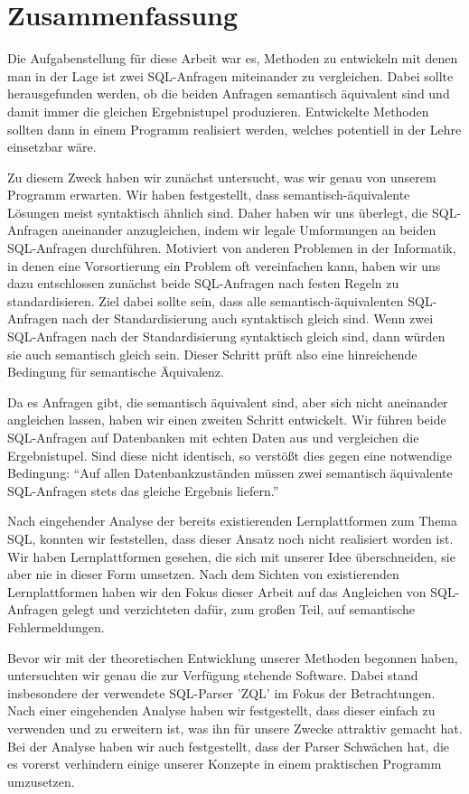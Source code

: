 
\section{Zusammenfassung}

Die Aufgabenstellung für diese Arbeit war es, Methoden zu entwickeln mit denen man in der Lage ist zwei SQL-Anfragen miteinander zu vergleichen. Dabei sollte herausgefunden werden, ob die beiden Anfragen semantisch äquivalent sind und damit immer die gleichen Ergebnistupel produzieren. Entwickelte Methoden sollten dann in einem Programm realisiert werden, welches potentiell in der Lehre einsetzbar wäre. 

Zu diesem Zweck haben wir zunächst untersucht, was wir genau von unserem Programm erwarten. Wir haben festgestellt, dass semantisch-äquivalente Lösungen meist syntaktisch ähnlich sind. Daher haben wir uns überlegt, die SQL-Anfragen aneinander anzugleichen, indem wir legale Umformungen an beiden SQL-Anfragen durchführen. Motiviert von anderen Problemen in der Informatik, in denen eine Vorsortierung ein Problem oft vereinfachen kann, haben wir uns dazu entschlossen zunächst beide SQL-Anfragen nach festen Regeln zu standardisieren. Ziel dabei sollte sein, dass alle semantisch-äquivalenten SQL-Anfragen nach der Standardisierung auch syntaktisch gleich sind. Wenn zwei SQL-Anfragen nach der Standardisierung syntaktisch gleich sind, dann würden sie auch semantisch gleich sein. Dieser Schritt prüft also eine hinreichende Bedingung für semantische Äquivalenz.

Da es Anfragen gibt, die semantisch äquivalent sind, aber sich nicht aneinander angleichen lassen, haben wir einen zweiten Schritt entwickelt. Wir führen beide SQL-Anfragen auf Datenbanken mit echten Daten aus und vergleichen die Ergebnistupel. Sind diese nicht identisch, so verstößt dies gegen eine notwendige Bedingung: ``Auf allen Datenbankzuständen müssen zwei semantisch äquivalente SQL-Anfragen stets das gleiche Ergebnis liefern.'' 

Nach eingehender Analyse der bereits existierenden Lernplattformen zum Thema SQL, konnten wir feststellen, dass dieser Ansatz noch nicht realisiert worden ist. Wir haben Lernplattformen gesehen, die sich mit unserer Idee überschneiden, sie aber nie in dieser Form umsetzen. Nach dem Sichten von existierenden Lernplattformen haben wir den Fokus dieser Arbeit auf das Angleichen von SQL-Anfragen gelegt und verzichteten dafür, zum großen Teil, auf semantische Fehlermeldungen. 

Bevor wir mit der theoretischen Entwicklung unserer Methoden begonnen haben, untersuchten wir genau die zur Verfügung stehende Software. Dabei stand insbesondere der verwendete SQL-Parser 'ZQL' im Fokus der Betrachtungen. Nach einer eingehenden Analyse haben wir festgestellt, dass dieser einfach zu verwenden und zu erweitern ist, was ihn für unsere Zwecke attraktiv gemacht hat. Bei der Analyse haben wir auch festgestellt, dass der Parser Schwächen hat, die es vorerst verhindern einige unserer Konzepte in einem praktischen Programm umzusetzen.

